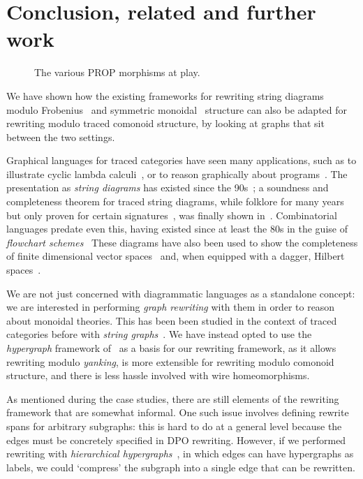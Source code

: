 \section{Conclusion, related and further work}

\begin{figure}
    \centering
    
    \caption{The various PROP morphisms at play.}
    \label{fig:roadmap}
\end{figure}

We have shown how the existing frameworks for rewriting string diagrams modulo
Frobenius~\cite{bonchi2022string} and symmetric
monoidal~\cite{bonchi2022stringa} structure can also be adapted for rewriting
modulo traced comonoid structure, by looking at graphs that sit between
the two settings.

Graphical languages for traced categories have seen many applications, such as
to illustrate cyclic lambda calculi~\cite{hasegawa1997recursion}, or to reason
graphically about programs~\cite{schweimeier1999categorical}.
The presentation as \emph{string diagrams} has existed since the
90s~\cite{joyal1991geometry,joyal1996traced}; a soundness and completeness
theorem for traced string diagrams, while folklore for many years but only
proven for certain signatures~\cite{selinger2011survey}, was finally shown
in~\cite{kissinger2014abstract}.
Combinatorial languages predate even this, having existed since at least the 80s
in the guise of
\emph{flowchart schemes}~\cite{stefanescu1990feedback,cazanescu1990new,cazanescu1994feedback}
These diagrams have also been used to show the completeness of finite dimensional
vector spaces~\cite{hasegawa2008finite} and, when equipped with a dagger,
Hilbert spaces~\cite{selinger2012finite}.

We are not just concerned with diagrammatic languages as a standalone concept:
we are interested in performing \emph{graph rewriting} with them in order to
reason about monoidal theories.
This has been been studied in the context of traced categories before with
\emph{string graphs}~\cite{kissinger2012pictures,dixon2013opengraphs}.
We have instead opted to use the \emph{hypergraph} framework
of~\cite{bonchi2022string,bonchi2022stringa,bonchi2022stringb} as a basis for our
rewriting framework, as it allows rewriting modulo \emph{yanking}, is more
extensible for rewriting modulo comonoid structure, and there is less hassle
involved with wire homeomorphisms.

As mentioned during the case studies, there are still elements of the rewriting
framework that are somewhat informal.
One such issue involves defining rewrite spans for arbitrary subgraphs: this is
hard to do at a general level because the edges must be concretely specified in
DPO rewriting.
However, if we performed rewriting with
\emph{hierarchical hypergraphs}~\cite{alvarez-picallo2021functorial}, in
which edges can have hypergraphs as labels, we could `compress' the subgraph
into a single edge that can be rewritten.

